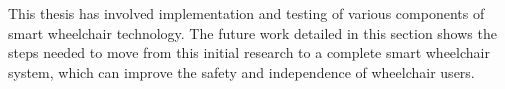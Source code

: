 This thesis has involved implementation and testing
of various components of smart wheelchair technology. The future work detailed in
this section shows the steps needed to move from this initial research to a complete
smart wheelchair system, which can improve the safety and independence of wheelchair users.








